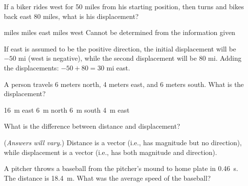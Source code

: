 \documentclass[]{exam}
\begin{document}
\begin{questions}
\begin{questions}


\question
If a biker rides west for 50 miles from his starting position, then turns and bikes back east 80 miles, what is his displacement?

\begin{choices}
 miles
 miles east
 miles west
\choice Cannot be determined from the information given
\end{choices}

\begin{solution}
If east is assumed to be the positive direction, the initial displacement will be $-50$ mi (west is negative), while the second displacement will be 80 mi. Adding the displacements: $-50 + 80 = 30$ mi east.
\end{solution}

\question
A person travels 6 meters north, 4 meters east, and 6 meters south. What is the displacement?

\begin{choices}
\choice \SI{16}{\meter} east
\choice \SI{6}{\meter} north
\choice \SI{6}{\meter} south
\CorrectChoice \SI{4}{\meter} east
\end{choices}

\question %
What is the difference between distance and displacement?

\begin{solution}
(\textit{Answers will vary.}) Distance is a vector (i.e., has magnitude but no direction), while displacement is a vector (i.e., has both magnitude and direction).
\end{solution}

\clearpage


\question
A pitcher throws a baseball from the pitcher's mound to home plate in \SI{0.46}{s}. The distance is \SI{18.4}{m}. What was the average speed of the baseball?


\end{questions}
\end{questions}
\end{document}
